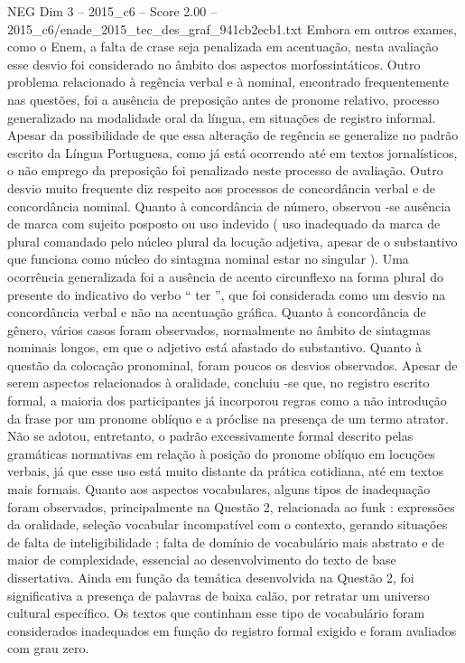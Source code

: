 \begin{textsample}{NEG Dim 3 – 2015\_c6 – Score 2.00 – 2015\_c6/enade\_2015\_tec\_des\_graf\_941cb2ecb1.txt}
Embora em outros exames, como o Enem, a falta de crase seja penalizada em acentuação, nesta avaliação esse desvio foi considerado no âmbito dos aspectos morfossintáticos.
Outro problema relacionado à regência verbal e à nominal, encontrado frequentemente nas questões, foi a ausência de preposição antes de pronome relativo, processo generalizado na modalidade oral da língua, em situações de registro informal.
Apesar da possibilidade de que essa alteração de regência se generalize no padrão escrito da Língua Portuguesa, como já está ocorrendo até em textos jornalísticos, o não emprego da preposição foi penalizado neste processo de avaliação.
Outro desvio muito frequente diz respeito aos processos de concordância verbal e de concordância nominal.
Quanto à concordância de número, observou -se ausência de marca com sujeito posposto ou uso indevido ( uso inadequado da marca de plural comandado pelo núcleo plural da locução adjetiva, apesar de o substantivo que funciona como núcleo do sintagma nominal estar no singular ).
Uma ocorrência generalizada foi a ausência de acento circunflexo na forma plural do presente do indicativo do verbo “ ter ”, que foi considerada como um desvio na concordância verbal e não na acentuação gráfica.
Quanto à concordância de gênero, vários casos foram observados, normalmente no âmbito de sintagmas nominais longos, em que o adjetivo está afastado do substantivo.
Quanto à questão da colocação pronominal, foram poucos os desvios observados.
Apesar de serem aspectos relacionados à oralidade, concluiu -se que, no registro escrito formal, a maioria dos participantes já incorporou regras como a não introdução da frase por um pronome oblíquo e a próclise na presença de um termo atrator.
Não se adotou, entretanto, o padrão excessivamente formal descrito pelas gramáticas normativas em relação à posição do pronome oblíquo em locuções verbais, já que esse uso está muito distante da prática cotidiana, até em textos mais formais.
Quanto aos aspectos vocabulares, alguns tipos de inadequação foram observados, principalmente na Questão 2, relacionada ao funk : expressões da oralidade, seleção vocabular incompatível com o contexto, gerando situações de falta de inteligibilidade ; falta de domínio de vocabulário mais abstrato e de maior de complexidade, essencial ao desenvolvimento do texto de base dissertativa.
Ainda em função da temática desenvolvida na Questão 2, foi significativa a presença de palavras de baixa calão, por retratar um universo cultural específico.
Os textos que continham esse tipo de vocabulário foram considerados inadequados em função do registro formal exigido e foram avaliados com grau zero.

\end{textsample}
